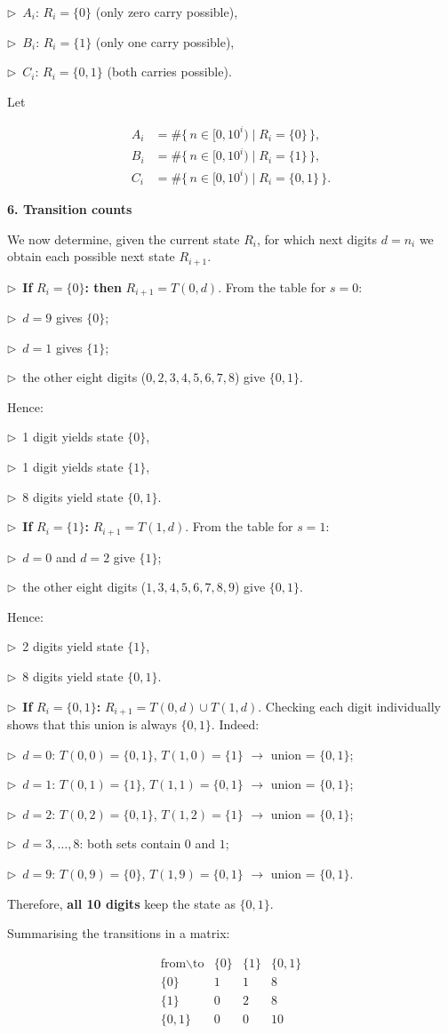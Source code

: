 \documentclass{llmxive}
\providecommand{\solutionheading}[1]{\par\smallskip\noindent\textbf{#1}\par}
\providecommand{\compactbullet}[1]{\par\noindent$\triangleright$~#1\par}
\begin{document}
\compactbullet{\(A_i\): \(R_i = \{0\}\) (only zero carry possible),}
\compactbullet{\(B_i\): \(R_i = \{1\}\) (only one carry possible),}
\compactbullet{\(C_i\): \(R_i = \{0,1\}\) (both carries possible).}
Let\par
\[
\begin{aligned}
A_i &= \#\{\, n \in [0,10^i) \mid R_i = \{0\} \,\}, \\
B_i &= \#\{\, n \in [0,10^i) \mid R_i = \{1\} \,\}, \\
C_i &= \#\{\, n \in [0,10^i) \mid R_i = \{0,1\} \,\}.
\end{aligned}
\]
\solutionheading{6. Transition counts}
We now determine, given the current state \(R_i\), for which next digits \(d = n_i\) we obtain each possible next state \(R_{i+1}\).\par
\compactbullet{\textbf{If }\(R_i = \{0\}\)\textbf{: then }\(R_{i+1} = T(0,d)\). From the table for \(s=0\):}
\compactbullet{\(d = 9\) gives \(\{0\}\);}
\compactbullet{\(d = 1\) gives \(\{1\}\);}
\compactbullet{the other eight digits (\(0,2,3,4,5,6,7,8\)) give \(\{0,1\}\).}
Hence:\par
\compactbullet{1 digit yields state \(\{0\}\),}
\compactbullet{1 digit yields state \(\{1\}\),}
\compactbullet{8 digits yield state \(\{0,1\}\).}
\compactbullet{\textbf{If }\(R_i = \{1\}\)\textbf{: }\(R_{i+1} = T(1,d)\). From the table for \(s=1\):}
\compactbullet{\(d = 0\) and \(d = 2\) give \(\{1\}\);}
\compactbullet{the other eight digits (\(1,3,4,5,6,7,8,9\)) give \(\{0,1\}\).}
Hence:\par
\compactbullet{2 digits yield state \(\{1\}\),}
\compactbullet{8 digits yield state \(\{0,1\}\).}
\compactbullet{\textbf{If }\(R_i = \{0,1\}\)\textbf{: }\(R_{i+1} = T(0,d) \cup T(1,d)\). Checking each digit individually shows that this union is always \(\{0,1\}\). Indeed:}
\compactbullet{\(d=0\): \(T(0,0)=\{0,1\}\), \(T(1,0)=\{1\}\) $\to$ union = \(\{0,1\}\);}
\compactbullet{\(d=1\): \(T(0,1)=\{1\}\), \(T(1,1)=\{0,1\}\) $\to$ union = \(\{0,1\}\);}
\compactbullet{\(d=2\): \(T(0,2)=\{0,1\}\), \(T(1,2)=\{1\}\) $\to$ union = \(\{0,1\}\);}
\compactbullet{\(d=3,\dots,8\): both sets contain \(0\) and \(1\);}
\compactbullet{\(d=9\): \(T(0,9)=\{0\}\), \(T(1,9)=\{0,1\}\) $\to$ union = \(\{0,1\}\).}
Therefore, \textbf{all 10 digits} keep the state as \(\{0,1\}\).\par
Summarising the transitions in a matrix:\par
\[
\begin{array}{c|ccc}
\text{from}\backslash\text{to} & \{0\} & \{1\} & \{0,1\} \\ \hline
\{0\} & 1 & 1 & 8 \\
\{1\} & 0 & 2 & 8 \\
\{0,1\} & 0 & 0 & 10
\end{array}
\]
\end{document}
